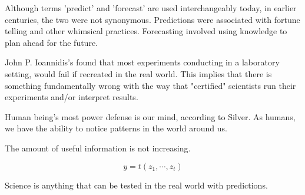 \documentclass[12pt]{article}
\begin{document}

\begin{enumerate}


Although terms 'predict' and  'forecast' are used interchangeably today, in earlier centuries, the two were not synonymous. Predictions were associated with fortune telling and other whimsical practices. Forecasting involved using knowledge to plan ahead for the future.


John P. Ioannidis's found that most experiments conducting in a laboratory setting, would fail if recreated in the real world. This implies that there is something fundamentally wrong with the way that "certified" scientists run their experiments and/or interpret results.


Human being's most power defense is our mind, according to Silver. As humans, we have the ability to notice patterns in the world around us.


The amount of useful information is not increasing.

\begin{equation*}
y=t(z_1,\cdots , z_t)
\end{equation*}


Science is anything that can be tested in the real world with predictions. 


\end{enumerate}
\end{document}
